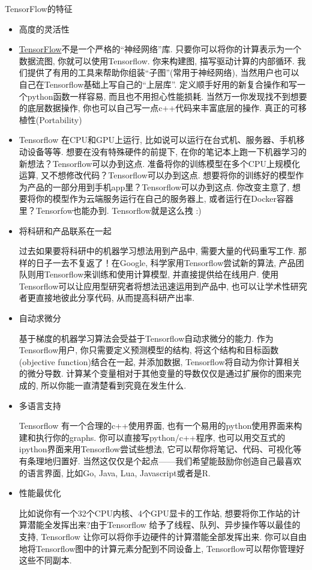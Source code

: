 TensorFlow的特征
\begin{itemize}
\item 高度的灵活性
\item \href{https://github.com/tensorflow}{TensorFlow}不是一个严格的“神经网络”库. 只要你可以将你的计算表示为一个数据流图, 你就可以使用Tensorflow. 你来构建图, 描写驱动计算的内部循环. 我们提供了有用的工具来帮助你组装“子图”(常用于神经网络), 当然用户也可以自己在Tensorflow基础上写自己的“上层库”. 定义顺手好用的新复合操作和写一个python函数一样容易, 而且也不用担心性能损耗. 当然万一你发现找不到想要的底层数据操作, 你也可以自己写一点c++代码来丰富底层的操作.
真正的可移植性(Portability)
\item Tensorflow 在CPU和GPU上运行, 比如说可以运行在台式机、服务器、手机移动设备等等. 想要在没有特殊硬件的前提下, 在你的笔记本上跑一下机器学习的新想法？Tensorflow可以办到这点. 准备将你的训练模型在多个CPU上规模化运算, 又不想修改代码？Tensorflow可以办到这点. 想要将你的训练好的模型作为产品的一部分用到手机app里？Tensorflow可以办到这点. 你改变主意了, 想要将你的模型作为云端服务运行在自己的服务器上, 或者运行在Docker容器里？Tensorfow也能办到. Tensorflow就是这么拽 :)
\item 将科研和产品联系在一起

过去如果要将科研中的机器学习想法用到产品中, 需要大量的代码重写工作. 那样的日子一去不复返了！在Google, 科学家用Tensorflow尝试新的算法, 产品团队则用Tensorflow来训练和使用计算模型, 并直接提供给在线用户. 使用Tensorflow可以让应用型研究者将想法迅速运用到产品中, 也可以让学术性研究者更直接地彼此分享代码, 从而提高科研产出率.
\item 自动求微分

基于梯度的机器学习算法会受益于Tensorflow自动求微分的能力. 作为Tensorflow用户, 你只需要定义预测模型的结构, 将这个结构和目标函数(objective function)结合在一起, 并添加数据, Tensorflow将自动为你计算相关的微分导数. 计算某个变量相对于其他变量的导数仅仅是通过扩展你的图来完成的, 所以你能一直清楚看到究竟在发生什么.
\item 多语言支持

Tensorflow 有一个合理的c++使用界面, 也有一个易用的python使用界面来构建和执行你的graphs. 你可以直接写python/c++程序, 也可以用交互式的ipython界面来用Tensorflow尝试些想法, 它可以帮你将笔记、代码、可视化等有条理地归置好. 当然这仅仅是个起点——我们希望能鼓励你创造自己最喜欢的语言界面, 比如Go, Java, Lua, Javascript或者是R.
\item 性能最优化

比如说你有一个32个CPU内核、4个GPU显卡的工作站, 想要将你工作站的计算潜能全发挥出来?由于Tensorflow 给予了线程、队列、异步操作等以最佳的支持, Tensorflow 让你可以将你手边硬件的计算潜能全部发挥出来. 你可以自由地将Tensorflow图中的计算元素分配到不同设备上, Tensorflow可以帮你管理好这些不同副本.


\end{itemize}
